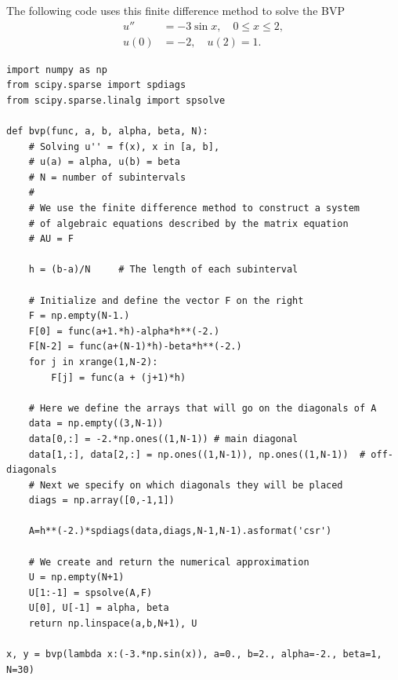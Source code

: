 The following code uses this finite difference method to solve the BVP
\begin{align*}
u'' &= -3 \sin{x}, \quad 0 \leq x \leq 2,\\
	u(0) &= -2,\quad u(2) = 1.
\end{align*}


\begin{lstlisting}
import numpy as np
from scipy.sparse import spdiags
from scipy.sparse.linalg import spsolve

def bvp(func, a, b, alpha, beta, N):
	# Solving u'' = f(x), x in [a, b],
	# u(a) = alpha, u(b) = beta
	# N = number of subintervals
	#
	# We use the finite difference method to construct a system 
	# of algebraic equations described by the matrix equation 
	# AU = F
	
	h = (b-a)/N 	# The length of each subinterval
	
	# Initialize and define the vector F on the right
	F = np.empty(N-1.)			
	F[0] = func(a+1.*h)-alpha*h**(-2.)
	F[N-2] = func(a+(N-1)*h)-beta*h**(-2.)
	for j in xrange(1,N-2): 
		F[j] = func(a + (j+1)*h)
	
	# Here we define the arrays that will go on the diagonals of A
	data = np.empty((3,N-1))
	data[0,:] = -2.*np.ones((1,N-1)) # main diagonal
	data[1,:], data[2,:] = np.ones((1,N-1)), np.ones((1,N-1))  # off-diagonals
	# Next we specify on which diagonals they will be placed
	diags = np.array([0,-1,1])
	
	A=h**(-2.)*spdiags(data,diags,N-1,N-1).asformat('csr')
	
	# We create and return the numerical approximation
	U = np.empty(N+1)
	U[1:-1] = spsolve(A,F)
	U[0], U[-1] = alpha, beta
	return np.linspace(a,b,N+1), U

x, y = bvp(lambda x:(-3.*np.sin(x)), a=0., b=2., alpha=-2., beta=1, N=30)
\end{lstlisting}

% 

